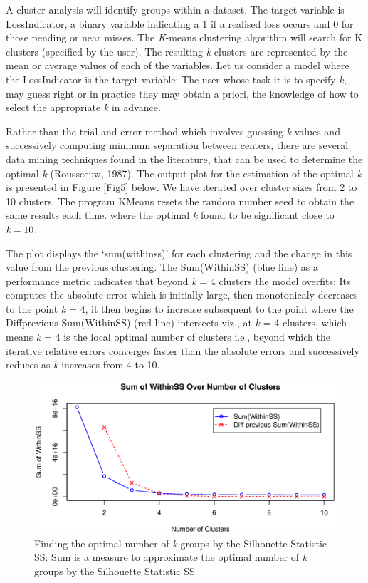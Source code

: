\documentclass[]{DissertateUSU}
\begin{document}
A cluster analysis will identify groups within a dataset. The target
variable is LossIndicator, a binary variable indicating a \(1\) if a
realised loss occurs and \(0\) for those pending or near misses. The
\emph{K}-means clustering algorithm will search for K clusters
(specified by the user). The resulting \emph{k} clusters are represented
by the mean or average values of each of the variables. Let us consider
a model where the LossIndicator is the target variable: The user whose
task it is to specify \emph{k}, may guess right or in practice they may
obtain a priori, the knowledge of how to select the appropriate \emph{k}
in advance.\medskip

Rather than the trial and error method which involves guessing \emph{k}
values and successively computing minimum separation between centers,
there are several data mining techniques found in the literature, that
can be used to determine the optimal \emph{k} (Rousseeuw, 1987). The
output plot for the estimation of the optimal \emph{k} is presented in
Figure \ref{Fig5} below. We have iterated over cluster sizes from 2 to
10 clusters. The program KMeans resets the random number seed to obtain
the same results each time. where the optimal \emph{k} found to be
significant close to \(\emph{k} = 10\).\medskip

The plot displays the `sum(withinss)' for each clustering and the change
in this value from the previous clustering. The Sum(WithinSS) (blue
line) as a performance metric indicates that beyond \emph{k} = 4
clusters the model overfits: Its computes the absolute error which is
initially large, then monotonicaly decreases to the point \emph{k} = 4,
it then begins to increase subsequent to the point where the
Diffprevious Sum(WithinSS) (red line) intersects viz., at \emph{k} = 4
clusters, which means \emph{k} = 4 is the local optimal number of
clusters i.e., beyond which the iterative relative errors converges
faster than the absolute errors and successively reduces as \emph{k}
increases from 4 to 10.

\begin{figure}
\centering
\includegraphics[scale=0.7]{IterateKmeans.eps}
\caption{Finding the optimal number of \emph{k} groups by the Silhouette Statistic SS: Sum is a  measure to approximate the optimal number of \emph{k} groups by the Silhouette Statistic SS}
\label{IterateKmeans}
\end{figure}
\end{document}
